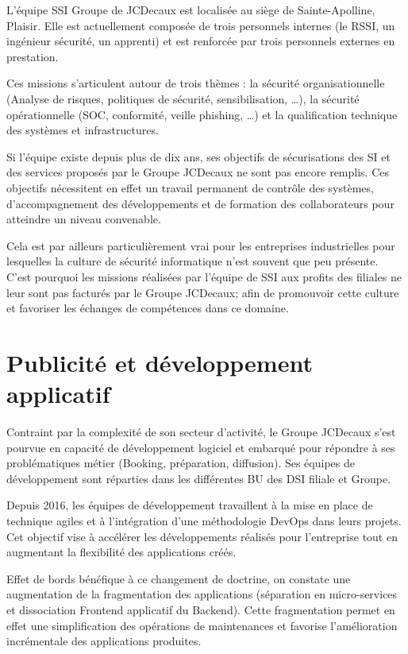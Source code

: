 L'équipe \ac{SSI} Groupe de JCDecaux est localisée au siège de Sainte-Apolline, Plaisir.
Elle est actuellement composée de trois personnels internes (le \ac{RSSI}, un ingénieur sécurité, un apprenti) et est 
renforcée par trois personnels externes en prestation.

Ces missions s'articulent autour de trois thèmes : la sécurité organisationnelle (Analyse de risques, 
politiques de sécurité, sensibilisation, \dots), la sécurité opérationnelle (\ac{SOC}, conformité, veille phishing, \dots) et 
la qualification technique des systèmes et infrastructures.

Si l'équipe existe depuis plus de dix ans, ses objectifs de sécurisations des \ac{SI} et des services proposés par le 
Groupe JCDecaux ne sont pas encore remplis. Ces objectifs nécessitent en effet un travail permanent de contrôle des 
systèmes, d'accompagnement des développements et de formation des collaborateurs pour atteindre un niveau convenable.

Cela est par ailleurs particulièrement vrai pour les entreprises industrielles pour lesquelles la culture de 
sécurité informatique n'est souvent que peu présente. 
\newline C'est pourquoi les missions réalisées par l'équipe de \ac{SSI} aux profits des filiales ne leur sont pas 
facturés par le Groupe JCDecaux; afin de promouvoir cette culture et favoriser les échanges de compétences dans ce domaine.  



\section{Publicité et développement applicatif}
Contraint par la complexité de son secteur d'activité, le Groupe JCDecaux s'est pourvue en capacité de développement
logiciel et embarqué pour répondre à ses problématiques métier (\eg Booking, préparation, diffusion).
Ses équipes de développement sont réparties dans les différentes \ac{BU} des \ac{DSI} filiale et Groupe.

Depuis 2016, les équipes de développement travaillent à la mise en place de technique agiles et à l'intégration d'une 
méthodologie DevOps dans leurs projets. Cet objectif vise à accélérer les développements réalisés 
pour l'entreprise tout en augmentant la flexibilité des applications créés. 

Effet de bords bénéfique à ce changement de doctrine, on constate une augmentation de la fragmentation des applications
(séparation en micro-services et dissociation Frontend applicatif du Backend). Cette fragmentation permet en effet une
simplification des opérations de maintenances et favorise l'amélioration incrémentale des applications produites.

